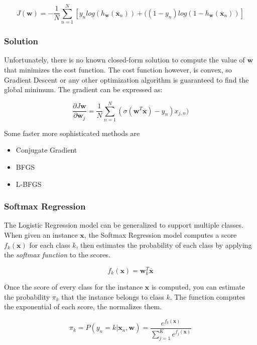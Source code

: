 \documentclass[12pt]{article}
\begin{document}
            $$J(\boldsymbol{w}) = -\frac{1}{N}\sum_{n=1}^N[y_n log(h_{\boldsymbol{w}}(\overline{\boldsymbol{x}}_n)) + ((1-y_n)log(1-h_{\boldsymbol{w}}(\overline{\boldsymbol{x}}_n))] $$

        \subsubsection{Solution}
            Unfortunately, there is no known closed-form solution to compute the value of $\boldsymbol{w}$ that minimizes the cost function. The cost function however, is convex, so Gradient Descent or 
            any other optimization algorithm is guaranteed to find the global minimum. The gradient can be expressed as:

            $$ \frac{\partial J{\boldsymbol{w}}}{\partial \boldsymbol{w}_j} = \frac{1}{N}\sum_{n=1}^N(\sigma(\boldsymbol{w}^T\overline{\boldsymbol{x}}) - y_n) x_{j,n}) $$
            
            Some faster more sophisticated methods are
            \begin{itemize}
                \item Conjugate Gradient
                \item BFGS
                \item L-BFGS
            \end{itemize}

        \subsubsection{Softmax Regression}
            The Logistic Regression model can be generalized to support multiple classes. When given an instance $\boldsymbol{x}$, the Softmax Regression model computes a score $f_k(\boldsymbol{x})$ for each class $k$,
            then estimates the probability of each class by applying the \textit{softmax function} to the scores. 

            $$ f_k(\boldsymbol{x}) = \boldsymbol{w}^T_k \overline{\boldsymbol{x}} $$

            Once the score of every class for the instance $\boldsymbol{x}$ is computed, you can estimate the probability $\pi_k$ that the instance belongs to class $k$. The function computes the exponential of each score, 
            the normalizes them.

            $$ \pi_k = P(y_n = k | \boldsymbol{x}_n, \boldsymbol{w}) = \frac{e^{f_k(\boldsymbol{x})}}{\sum_{j=1}^K e^{f_j(\boldsymbol{x})}} $$
\end{document}
